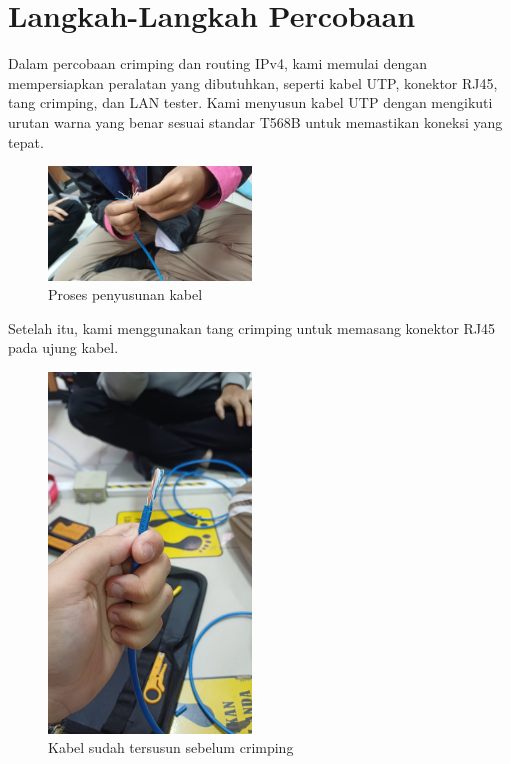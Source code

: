 
\section{Langkah-Langkah Percobaan}
Dalam percobaan crimping dan routing IPv4, kami memulai dengan mempersiapkan peralatan yang dibutuhkan, seperti kabel UTP, konektor RJ45, tang crimping, dan LAN tester. Kami menyusun kabel UTP dengan mengikuti urutan warna yang benar sesuai standar T568B untuk memastikan koneksi yang tepat. 

\begin{figure}[H]
    \centering
    \includegraphics[width=0.48\textwidth]{P1/img/Crimping 1.jpeg}
    \caption{Proses penyusunan kabel}
    \label{fig:crimping1}
\end{figure}

Setelah itu, kami menggunakan tang crimping untuk memasang konektor RJ45 pada ujung kabel. 

\begin{figure}[H]
    \centering
    \includegraphics[width=0.48\textwidth]{P1/img/Crimping 2.jpeg}
    \caption{Kabel sudah tersusun sebelum crimping}
    \label{fig:crimping2}
\end{figure}

